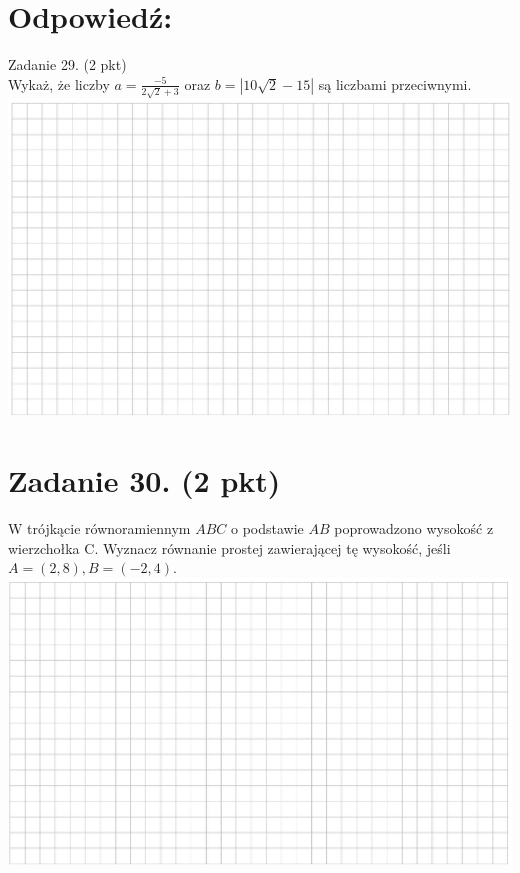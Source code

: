 \documentclass[10pt]{article}
\begin{document}
\section*{Odpowiedź:}
Zadanie 29. (2 pkt)\\
Wykaż, że liczby \(a=\frac{-5}{2 \sqrt{2}+3}\) oraz \(b=|10 \sqrt{2}-15|\) są liczbami przeciwnymi.\\
\includegraphics[max width=\textwidth, center]{2024_11_21_9a9f600c3b3af5013d80g-11}

\section*{Zadanie 30. (2 pkt)}
W trójkącie równoramiennym \(A B C\) o podstawie \(A B\) poprowadzono wysokość z wierzchołka C. Wyznacz równanie prostej zawierającej tę wysokość, jeśli \(A=(2,8), B=(-2,4)\).\\
\includegraphics[max width=\textwidth, center]{2024_11_21_9a9f600c3b3af5013d80g-12(1)}
\end{document}
